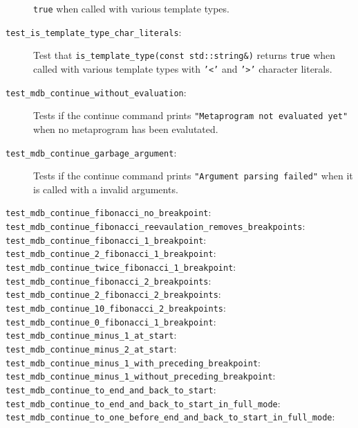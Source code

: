 \begin{description}
        \texttt{true} when called with various template types.
    \item[\texttt{test\_is\_template\_type\_char\_literals}:]
        Test that \texttt{is\_template\_type(const std::string\&)} returns
        \texttt{true} when called with various template types with
        \texttt{'<'} and \texttt{'>'} character literals.
    \item[\texttt{test\_mdb\_continue\_without\_evaluation}:]
        Tests if the continue command prints
        \texttt{"Metaprogram not evaluated yet"} when no metaprogram has been
        evalutated.
    \item[\texttt{test\_mdb\_continue\_garbage\_argument}:]
        Tests if the continue command prints
        \texttt{"Argument parsing failed"} when it is called with a invalid
        arguments.
    \item[\texttt{test\_mdb\_continue\_fibonacci\_no\_breakpoint}:]
    \item[\texttt{test\_mdb\_continue\_fibonacci\_reevaulation\_removes\_breakpoints}:]
    \item[\texttt{test\_mdb\_continue\_fibonacci\_1\_breakpoint}:]
    \item[\texttt{test\_mdb\_continue\_2\_fibonacci\_1\_breakpoint}:]
    \item[\texttt{test\_mdb\_continue\_twice\_fibonacci\_1\_breakpoint}:]
    \item[\texttt{test\_mdb\_continue\_fibonacci\_2\_breakpoints}:]
    \item[\texttt{test\_mdb\_continue\_2\_fibonacci\_2\_breakpoints}:]
    \item[\texttt{test\_mdb\_continue\_10\_fibonacci\_2\_breakpoints}:]
    \item[\texttt{test\_mdb\_continue\_0\_fibonacci\_1\_breakpoint}:]
    \item[\texttt{test\_mdb\_continue\_minus\_1\_at\_start}:]
    \item[\texttt{test\_mdb\_continue\_minus\_2\_at\_start}:]
    \item[\texttt{test\_mdb\_continue\_minus\_1\_with\_preceding\_breakpoint}:]
    \item[\texttt{test\_mdb\_continue\_minus\_1\_without\_preceding\_breakpoint}:]
    \item[\texttt{test\_mdb\_continue\_to\_end\_and\_back\_to\_start}:]
    \item[\texttt{test\_mdb\_continue\_to\_end\_and\_back\_to\_start\_in\_full\_mode}:]
    \item[\texttt{test\_mdb\_continue\_to\_one\_before\_end\_and\_back\_to\_start\_in\_full\_mode}:]

\end{description}
